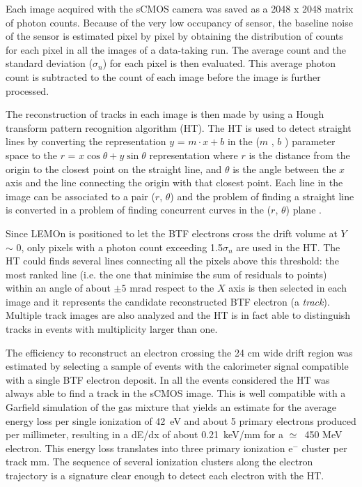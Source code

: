 \documentclass[review]{elsarticle}
\begin{document}
Each image acquired with the sCMOS camera was saved as a 2048 x 2048 matrix of photon counts. 
 Because of the very low occupancy of sensor, the baseline noise of the sensor is estimated pixel by pixel by obtaining the distribution of counts for each pixel in all the images of a data-taking run. The  average count and the standard deviation ($\sigma_n$) for each pixel is then evaluated. This average photon count  is subtracted to the count of each image before the image is further processed\cite{bib:fe55}. 
 
 The reconstruction  of tracks in each image is then made by using a Hough transform pattern recognition algorithm (HT).
 The HT is used to detect  straight lines  by converting the representation  $y$ = $m \cdot x + b$ in the ($m$ , $b$ ) parameter space to the $r$ = $x \cos \theta + y \sin \theta$ representation where $r$ is the distance from the origin to the closest point on the straight line, and $ \theta $ is the angle between the $x$ axis and the line connecting the origin with that closest point. Each line in the image can be associated to a pair ($r$, $\theta$) and the problem of finding a straight line is converted in a problem of finding concurrent curves in the ($r$, $\theta$) plane \cite{bib:hough}.
 
 Since LEMOn is positioned to let the BTF electrons cross the drift volume at $Y$ $\sim$ 0, only pixels with a photon count exceeding 1.5$\sigma_n$ are used in the HT. The HT could finds several lines connecting all the pixels above this threshold: the most ranked line (i.e. the one that minimise the sum of residuals to points) within an angle of about $\pm 5$ mrad respect to the $X$ axis is then selected in each image and it represents the candidate reconstructed BTF electron (a {\it track}). Multiple track images are also analyzed and the HT is in fact able to distinguish  tracks in events with multiplicity larger than one.
 

The efficiency to reconstruct an electron crossing the 24 cm wide drift region  was estimated by selecting a sample of events with the calorimeter signal compatible with a single BTF  electron  deposit. In all the events considered  the HT was always able to find a track in the sCMOS image. This is well compatible with a Garfield \cite{bib:garfield1, bib:garfield} simulation of the  gas mixture that yields an  estimate for the average  energy loss per single ionization of 42~eV and about 5 primary electrons produced per millimeter, resulting in a dE/dx of about 0.21~keV/mm for a $\simeq$~450 MeV electron. This energy loss translates into three primary ionization e$^-$ cluster per track mm. The sequence of several ionization clusters along the electron trajectory is  a  signature  clear enough to detect each electron with the HT.
\end{document}
